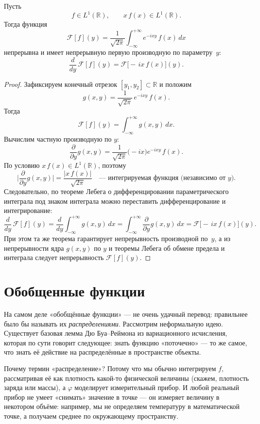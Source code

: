 \begin{theorem}
Пусть
\[
f\in L^1(\mathbb R),
\qquad
x\,f(x)\in L^1(\mathbb R).
\]
Тогда функция
\[
\mathcal F[f](y)
=\frac1{\sqrt{2\pi}}\int_{-\infty}^{+\infty}e^{-i x y}\,f(x)\,dx
\]
непрерывна и имеет непрерывную первую производную по параметру~$y$:
\[
\frac{d}{dy}\,\mathcal F[f](y)
=\mathcal F\bigl[-\,i x\,f(x)\bigr](y).
\]
\end{theorem}

\begin{proof}
Зафиксируем конечный отрезок $[y_1,y_2]\subset\mathbb R$ и положим
\[
g(x,y)
=\frac1{\sqrt{2\pi}}\,e^{-i x y}\,f(x).
\]
Тогда
\[
\mathcal F[f](y)=\int_{-\infty}^{+\infty}g(x,y)\,dx.
\]
Вычислим частную производную по $y$:
\[
\frac{\partial}{\partial y}g(x,y)
=\frac1{\sqrt{2\pi}}\bigl(-i x\bigr)e^{-i x y}\,f(x).
\]
По условию $x\,f(x)\in L^1(\mathbb R)$, поэтому
\[
\biggl|\frac{\partial}{\partial y}g(x,y)\biggr|
=\frac{|x\,f(x)|}{\sqrt{2\pi}}
\quad\text{— интегрируемая функция (независимо от $y$).}
\]
Следовательно, по теореме Лебега о дифференцировании параметрического
интеграла под знаком интеграла можно переставить дифференцирование и
интегрирование:
\[
\frac{d}{dy}\,\mathcal F[f](y)
=\frac{d}{dy}\int_{-\infty}^{+\infty}g(x,y)\,dx
=\int_{-\infty}^{+\infty}\frac{\partial}{\partial y}g(x,y)\,dx
=\mathcal F\bigl[-\,i x\,f(x)\bigr](y).
\]
При этом та же теорема гарантирует непрерывность производной по~$y$,
а из непрерывности ядра $g(x,y)$ по $y$ и теоремы Лебега об обмене
предела и интеграла следует непрерывность $\mathcal F[f](y)$.
\end{proof}


\section{Обобщенные функции}
На самом деле «обобщённые функции» --- не очень удачный перевод: правильнее было бы называть их \emph{распределениями}. Рассмотрим неформальную идею. Существует базовая лемма Дю Буа--Реймона из вариационного исчисления, которая по сути говорит следующее: знать функцию «поточечно» --- то же самое, что знать её действие на распределённые в пространстве объекты.

Почему термин «распределение»? Потому что мы обычно интегрируем \(f\), рассматривая её как плотность какой-то физической величины (скажем, плотность заряда или массы), а \(\varphi\) моделирует измерительный прибор. И любой реальный прибор не умеет «снимать» значение в точке --- он измеряет величину в некотором объёме: например, мы не определяем температуру в математической точке, а получаем среднее по окружающему пространству.

